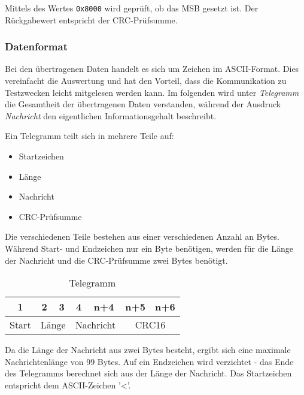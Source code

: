 Mittels des Wertes \lstinline!0x8000! wird geprüft, ob das \ac{MSB} gesetzt ist. Der Rückgabewert entspricht der CRC-Prüfsumme. 

\newpage

\subsubsection{Datenformat}
\label{subsub: Datenformat}

Bei den übertragenen Daten handelt es sich um Zeichen im \acs{ASCII}-Format. Dies vereinfacht die Auswertung und hat den Vorteil, dass die Kommunikation
zu Testzwecken leicht mitgelesen werden kann. Im folgenden wird unter \textit{Telegramm} die Gesamtheit der übertragenen Daten verstanden, während 
der Ausdruck \textit{Nachricht} den eigentlichen Informationsgehalt beschreibt.

\smallskip

Ein Telegramm teilt sich in mehrere Teile auf:

\begin{itemize}
    \item Startzeichen
    \item Länge
    \item Nachricht
    \item CRC-Prüfsumme
\end{itemize}



Die verschiedenen Teile bestehen aus einer verschiedenen Anzahl an Bytes. Während Start- und Endzeichen nur ein Byte benötigen, werden für die
Länge der Nachricht und die CRC-Prüfsumme zwei Bytes benötigt.

\smallskip

\begin{wraptable}{r}{75mm} 
    
    \begin{tabular}{ |c | c | c | c | c | c | c | }
        \hline
        1 & 2 & 3 & 4 & n+4 & n+5 & n+6  \\
        \hline \hline
        Start  & \multicolumn{2}{|c|}{Länge} & \multicolumn{2}{|c|}{Nachricht} & \multicolumn{2}{|c|}{CRC16} \\
        \hline
    
      \end{tabular}
    \centering
    \caption{Telegramm}
    \end{wraptable}


Da die Länge der Nachricht aus zwei Bytes besteht, ergibt sich eine maximale Nachrichtenlänge von 99 Bytes. Auf ein Endzeichen wird verzichtet - 
das Ende des Telegramms berechnet sich aus der Länge der Nachricht. Das Startzeichen entspricht dem \acs{ASCII}-Zeichen '<'.

